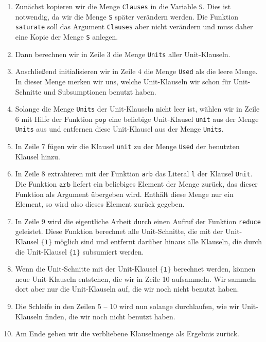 \begin{enumerate}
\item Zunächst kopieren wir die Menge \texttt{Clauses} in die Variable \texttt{S}.
      Dies ist notwendig, da wir die Menge \texttt{S} später verändern werden.  Die Funktion
      \texttt{saturate} soll das Argument \texttt{Clauses} aber nicht verändern und muss daher
      eine Kopie der Menge \texttt{S} anlegen.
\item Dann berechnen wir in Zeile 3 die Menge \texttt{Units} aller Unit-Klauseln.  
\item Anschließend initialisieren wir in Zeile 4 die Menge \texttt{Used} als die leere Menge.
      In dieser Menge merken wir uns, welche Unit-Klauseln wir schon für Unit-Schnitte und
      Subsumptionen benutzt haben.
\item Solange die Menge \texttt{Units} der Unit-Klauseln nicht leer ist, wählen wir in Zeile 6
      mit Hilfe der Funktion $\texttt{pop}$ eine beliebige Unit-Klausel \texttt{unit} aus der Menge
      \texttt{Units} aus und entfernen diese Unit-Klausel aus der Menge \texttt{Units}. 
\item In Zeile 7 fügen wir die Klausel \texttt{unit} zu der Menge
      \texttt{Used} der benutzten Klausel hinzu.  
\item In Zeile 8 extrahieren mit der Funktion \texttt{arb} das Literal \texttt{l} der Klausel
      \texttt{Unit}.  Die Funktion $\texttt{arb}$ liefert ein beliebiges Element der Menge zurück,
      das dieser Funktion als Argument übergeben wird.  Enthält diese Menge nur ein Element, so
      wird also dieses Element zurück gegeben.
\item In Zeile 9 wird  die eigentliche Arbeit durch einen Aufruf der Funktion
      \texttt{reduce} geleistet.  Diese Funktion berechnet alle Unit-Schnitte, die mit der
      Unit-Klausel $\{\texttt{l}\}$ möglich sind und entfernt darüber hinaus alle Klauseln, die
      durch die Unit-Klausel $\{\texttt{l}\}$ subsumiert werden.
\item Wenn die Unit-Schnitte mit der Unit-Klausel $\{\texttt{l}\}$ berechnet werden, können neue
      Unit-Klauseln entstehen, die wir in Zeile 10 aufsammeln.  Wir sammeln dort aber nur die Unit-Klauseln auf,
       die wir noch nicht benutzt haben. 
\item Die Schleife in den Zeilen 5 -- 10 wird nun solange durchlaufen, wie wir 
      Unit-Klauseln finden, die wir noch nicht benutzt haben.
\item Am Ende geben wir die verbliebene Klauselmenge als Ergebnis zurück.
\end{enumerate}
